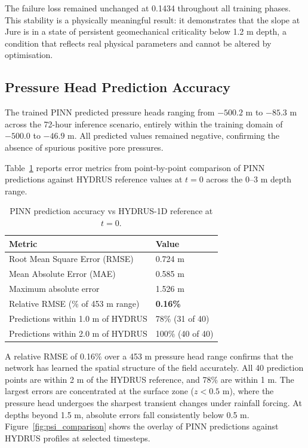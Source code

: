 \documentclass[12pt]{report}
\begin{document}
The failure loss remained unchanged at 0.1434 throughout all training
phases. This stability is a physically meaningful result: it
demonstrates that the slope at Jure is in a state of persistent
geomechanical criticality below 1.2 m depth, a condition that
reflects real physical parameters and cannot be altered by
optimisation.

\subsection{Pressure Head Prediction Accuracy}

The trained PINN predicted pressure heads ranging from $-500.2$ m
to $-85.3$ m across the 72-hour inference scenario, entirely within
the training domain of $-500.0$ to $-46.9$ m. All predicted values
remained negative, confirming the absence of spurious positive pore
pressures.

Table~\ref{tab:accuracy} reports error metrics from point-by-point
comparison of PINN predictions against HYDRUS reference values at
$t = 0$ across the 0--3 m depth range.

\begin{table}[htbp]
\centering
\begin{tabular}{ll}
\hline
\textbf{Metric} & \textbf{Value} \\
\hline
Root Mean Square Error (RMSE)              & 0.724 m \\
Mean Absolute Error (MAE)                  & 0.585 m \\
Maximum absolute error                     & 1.526 m \\
Relative RMSE (\% of 453 m range)          & \textbf{0.16\%} \\
Predictions within 1.0 m of HYDRUS         & 78\% (31 of 40) \\
Predictions within 2.0 m of HYDRUS         & 100\% (40 of 40) \\
\hline
\end{tabular}
\caption{PINN prediction accuracy vs HYDRUS-1D reference at $t = 0$.}
\label{tab:accuracy}
\end{table}

A relative RMSE of 0.16\% over a 453 m pressure head range confirms
that the network has learned the spatial structure of the field
accurately. All 40 prediction points are within 2 m of the HYDRUS
reference, and 78\% are within 1 m. The largest errors are
concentrated at the surface zone ($z < 0.5$ m), where the pressure
head undergoes the sharpest transient changes under rainfall forcing.
At depths beyond 1.5 m, absolute errors fall consistently below
0.5 m. Figure~\ref{fig:psi_comparison} shows the overlay of PINN
predictions against HYDRUS profiles at selected timesteps.
\end{document}

